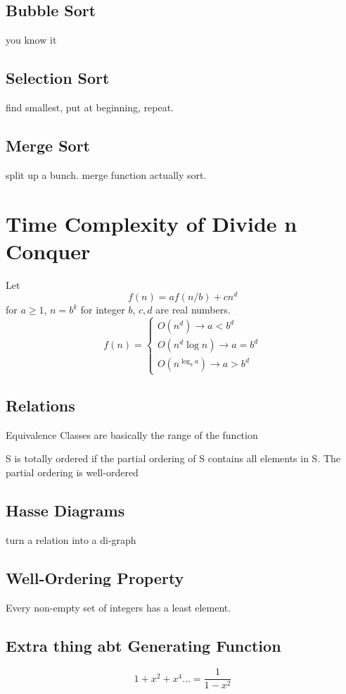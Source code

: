 \documentclass{report}
\begin{document}
 \subsection{Bubble Sort}
 you know it
 
 \subsection{Selection Sort}
 find smallest, put at beginning, repeat.
 
 \subsection{Merge Sort}
 split up a bunch. merge function actually sort.

\section{Time Complexity of Divide n Conquer}
Let
\[
f(n) = af(n/b) + cn^d
\]
for $a \geq 1$, $n = b^k$ for integer $b$, $c, d$ are real numbers.
\[
f(n)
=
\begin{cases}
O(n^d) \rightarrow a < b^d \\ 
O(n^d\log n) \rightarrow a = b^d \\
O(n^{\log_ba}) \rightarrow a > b^d
\end{cases}
\]

\subsection{Relations}
Equivalence Classes are basically the range of the function

S is totally ordered if the partial ordering of S contains all elements in S. The partial ordering is well-ordered 

\subsection{Hasse Diagrams}
turn a relation into a di-graph



\subsection{Well-Ordering Property}
Every non-empty set of integers has a least element.



\subsection{Extra thing abt Generating Function}
\[
1 + x^2 + x^4 \ldots = \frac{1}{1 - x^2}
\]
\end{document}
